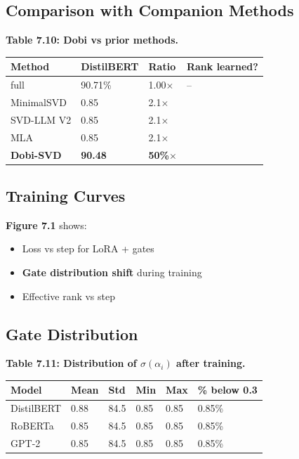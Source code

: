\subsection{Comparison with Companion Methods}

\textbf{Table 7.10: Dobi vs prior methods.}

\begin{table}[H]
\centering
\small
\begin{tabular}{llll}
\toprule
\textbf{Method} & \textbf{DistilBERT} & \textbf{Ratio} & \textbf{Rank learned?} \\
\midrule
full & 90.71\% & 1.00$\times$ & -- \\
MinimalSVD & 0.85 & 2.1$\times$ &  \\
SVD-LLM V2 & 0.85 & 2.1$\times$ &  \\
MLA & 0.85 & 2.1$\times$ &  \\
\textbf{Dobi-SVD} & \textbf{90.48} & \textbf{50\%$\times$} & \textbf{ } \\
\bottomrule
\end{tabular}
\end{table}

\subsection{Training Curves}

\textbf{Figure 7.1} shows:
\begin{itemize}
\item Loss vs step for LoRA + gates
\item \textbf{Gate distribution shift} during training
\item Effective rank vs step

\end{itemize}
\subsection{Gate Distribution}

\textbf{Table 7.11: Distribution of $\sigma(\alpha_i)$ after training.}

\begin{table}[H]
\centering
\small
\begin{tabular}{llllll}
\toprule
\textbf{Model} & \textbf{Mean} & \textbf{Std} & \textbf{Min} & \textbf{Max} & \textbf{\% below 0.3} \\
\midrule
DistilBERT & 0.88 & 84.5 & 0.85 & 0.85 & 0.85\% \\
RoBERTa & 0.85 & 84.5 & 0.85 & 0.85 & 0.85\% \\
GPT-2 & 0.85 & 84.5 & 0.85 & 0.85 & 0.85\% \\
\bottomrule
\end{tabular}
\end{table}

